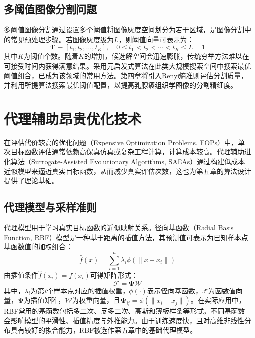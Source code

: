 \subsection{多阈值图像分割问题}

多阈值图像分割通过设置多个阈值将图像灰度空间划分为若干区域，是图像分割中的常见预处理步骤\cite{sbo_ref79,sbo_ref80}。若图像灰度级为$L$，则阈值向量可表示为：
\begin{equation}
\boldsymbol{T} = [t_1, t_2, \ldots, t_K], \quad 0 \le t_1 < t_2 < \cdots < t_K \le L-1
\end{equation}
其中$K$为阈值个数。随着$K$的增加，候选解空间会迅速膨胀，传统穷举方法难以在可接受时间内获得满意结果。采用元启发式算法在此类大规模搜索空间中搜索最优阈值组合，已成为该领域的常用方法\cite{sbo_ref82}。第四章将引入Renyi熵准则评估分割质量，并利用所提算法搜索最优阈值配置，以提高乳腺癌组织学图像的分割精细度\cite{sbo_ref83}。

\section{代理辅助昂贵优化技术}

在评估代价较高的优化问题（Expensive Optimization Problems, EOPs）中，单次目标函数评估通常依赖高保真仿真或复杂工程计算，计算成本较高\cite{liu2023airfoils,kumar2024optimization}。代理辅助进化算法（Surrogate-Assisted Evolutionary Algorithms, SAEAs）通过构建低成本近似模型来逼近真实目标函数，从而减少真实评估次数\cite{he2023review,jin2018data}，这也为第五章的算法设计提供了理论基础。

\subsection{代理模型与采样准则}
\label{sec:ch2_surrogate_models}

代理模型用于学习真实目标函数的近似映射关系\cite{kudela2022recent}。径向基函数（Radial Basis Function, RBF）模型是一种基于距离的插值方法\cite{regis2013evolutionary}，其预测值可表示为已知样本点基函数值的加权组合：
\begin{equation}
\hat{f}(x) = \sum_{i=1}^{n} \lambda_i \phi(\|x - x_i\|)
\end{equation}
由插值条件$\hat{f}(x_i) = f(x_i)$可得矩阵形式：
\begin{equation}
\mathcal{F} = \boldsymbol{\Psi} \mathcal{W}
\end{equation}
其中，$\lambda_i$为第$i$个样本点对应的插值权重，$\phi(\cdot)$表示径向基函数，$\mathcal{F}$为函数值向量，$\boldsymbol{\Psi}$为插值矩阵，$\mathcal{W}$为权重向量，且$\boldsymbol{\Psi}_{ij} = \phi(\|x_i - x_j\|)$。在实际应用中，RBF常用的基函数包括多二次、反多二次、高斯和薄板样条等形式，不同基函数会影响模型的平滑性、插值精度与外推能力\cite{forrester2008engineering,kudela2022recent}。由于训练速度快，且对高维非线性分布具有较好的拟合能力\cite{kudela2022recent}，RBF被选作第五章中的基础代理模型。

